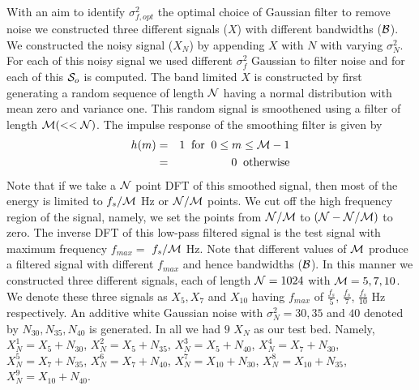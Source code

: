 \documentclass[journal,onecolumn]{IEEEtran}
\newcommand{\fs}{f_{s}}
\newcommand{\fmax}{f_{max}}
\newcommand{\Noise}{N}
\newcommand{\Signal}{X}
\newcommand{\g}{f}
\renewcommand{\S}{{\cal S}}
\newcommand{\BW}{{\cal B}}
\newcommand{\slength}{{\cal N}}
\newcommand{\flength}{{\cal M}}
\newcommand{\dt}{m}
\begin{document}
With an aim to identify $\sigma_{\g,opt}^2$ the optimal choice of 
Gaussian filter to remove noise we constructed three different signals 
($\Signal$) with different bandwidths ($\BW$). We constructed the noisy 
signal ($\Signal_\Noise$) by appending $\Signal$ with $\Noise$ with 
varying $\sigma_\Noise^2$. For each of this noisy signal we used 
different $\sigma_\g^2$ Gaussian to filter noise and for each of this 
$\S_o$ is computed.
The band limited $\Signal$  is constructed by first generating 
a random sequence of length $\slength$ having a normal distribution with mean
zero and variance one. This random signal is smoothened using a filter of length $\flength
(<< \slength)$. The impulse response of the smoothing filter is given by
\begin{eqnarray}
h(\dt) &=& {1} \;\; \mbox{for}\;\; 0 \le \dt \le \flength-1 \nonumber \\
&=& 0 \;\; \mbox{otherwise}
\end{eqnarray}
Note that if we take a $\slength$ point DFT of this smoothed signal, then most of the energy is
limited to $\fs/\flength$ Hz or $\slength/\flength$ points. We cut off the high frequency region of the signal, namely,
we set the points from  $\slength /\flength$ to $(\slength-\slength /\flength)$
to zero. The inverse DFT of this low-pass filtered signal is the test signal with maximum frequency $\fmax =$
$\fs/\flength$ Hz. Note that different values of $\flength$ produce a filtered signal with different $\fmax$ and 
hence bandwidths ($\BW$).
In this manner we constructed three different signals, each  of length 
$\slength = 1024$ with $\flength =5, 7, 10$. We denote these three signals as
$\Signal_{5}, \Signal_{7}$ and $\Signal_{10}$ having $\fmax$ of 
$\frac{\fs}{5}$,
$\frac{\fs}{7}$,
$\frac{\fs}{10}$ Hz
respectively. 
An additive white Gaussian 
noise with $\sigma_\Noise^2 = 30, 35$ and $40$ denoted by $\Noise_{30}, 
\Noise_{35}, \Noise_{40}$ is generated.
In all we had $9$ $\Signal_\Noise$ as our test bed. Namely,
 $\Signal_\Noise^1 = \Signal_5 + \Noise_{30}$, 
 $\Signal_\Noise^2 = \Signal_5 + \Noise_{35}$, 
 $\Signal_\Noise^3 = \Signal_5 + \Noise_{40}$, 
 $\Signal_\Noise^4 = \Signal_7 + \Noise_{30}$, 
 $\Signal_\Noise^5 = \Signal_7 + \Noise_{35}$, 
 $\Signal_\Noise^6 = \Signal_7 + \Noise_{40}$, 
 $\Signal_\Noise^7 = \Signal_{10} + \Noise_{30}$, 
 $\Signal_\Noise^8 = \Signal_{10} + \Noise_{35}$, 
 $\Signal_\Noise^9 = \Signal_{10} + \Noise_{40}$.
\end{document}
